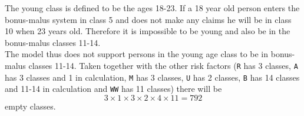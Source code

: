 \documentclass[11pt]{article}
\begin{document}
The young class is defined to be the ages 18-23. If a 18 year old person enters the bonus-malus system in class 5 and does not make any claims he will be in class 10 when 23 years old. Therefore it is impossible to be young and also be in the bonus-malus classes 11-14. \\

The model thus does not support persons in the young age class to be in bonus-malus classes 11-14. Taken together with the other risk factors (\verb|R| has 3 classes, \verb|A| has 3 classes and 1 in calculation, \verb|M| has 3 classes, \verb|U| has 2 classes, \verb|B| has 14 classes and 11-14 in calculation and \verb|WW| has 11 classes) there will be \begin{equation}
3 \times 1 \times 3 \times 2 \times 4 \times 11 = 792 
\end{equation}
empty classes.
\end{document}
